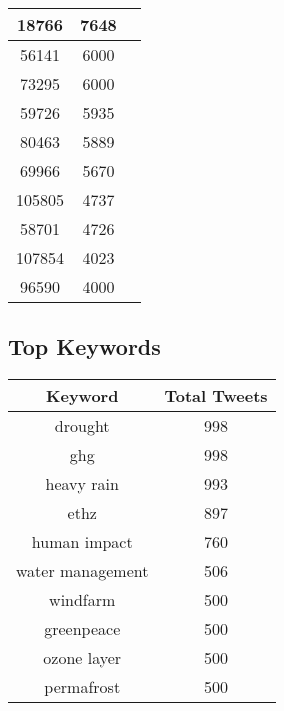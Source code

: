 \documentclass{article}\usepackage[T1]{fontenc}
\begin{document}
\begin{tabular}{|c|c|c|}
 \hline
18766 & 7648\\ 
 \hline
56141 & 6000\\ 
 \hline
73295 & 6000\\ 
 \hline
59726 & 5935\\ 
 \hline
80463 & 5889\\ 
 \hline
69966 & 5670\\ 
 \hline
105805 & 4737\\ 
 \hline
58701 & 4726\\ 
 \hline
107854 & 4023\\ 
 \hline
96590 & 4000\\ 
 \hline
\end{tabular}\subsection*{Top Keywords}\begin{tabular}{|c|c|}         \hline         Keyword & Total Tweets \\ 
 \hline
drought & 998\\ 
 \hline
ghg & 998\\ 
 \hline
heavy rain & 993\\ 
 \hline
ethz & 897\\ 
 \hline
human impact & 760\\ 
 \hline
water management & 506\\ 
 \hline
windfarm & 500\\ 
 \hline
greenpeace & 500\\ 
 \hline
ozone layer & 500\\ 
 \hline
permafrost & 500\\ 
 \hline
\end{tabular}
\end{document}
